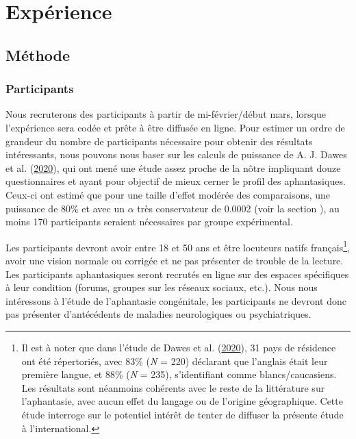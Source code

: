 \documentclass[
  12pt,
]{article}
\begin{document}
\hypertarget{expuxe9rience}{%
\section{Expérience}\label{expuxe9rience}}

\hypertarget{muxe9thode}{%
\subsection{Méthode}\label{muxe9thode}}

\hypertarget{participants}{%
\subsubsection{Participants}\label{participants}}

Nous recruterons des participants à partir de mi-février/début mars,
lorsque l'expérience sera codée et prête à être diffusée en ligne. Pour
estimer un ordre de grandeur du nombre de participants nécessaire pour
obtenir des résultats intéressants, nous pouvons nous baser sur les
calculs de puissance de A. J. Dawes et al.
(\protect\hyperlink{ref-dawesCognitiveProfileMultisensory2020}{2020}),
qui ont mené une étude assez proche de la nôtre impliquant douze
questionnaires et ayant pour objectif de mieux cerner le profil des
aphantasiques. Ceux-ci ont estimé que pour une taille d'effet modérée
des comparaisons, une puissance de 80\% et avec un \(\alpha\) très
conservateur de 0.0002 (voir la section \emph{}), au
moins 170 participants seraient nécessaires par groupe expérimental.

Les participants devront avoir entre 18 et 50 ans et être locuteurs
natifs français\footnote{Il est à noter que dans l'étude de Dawes et al.
  (\protect\hyperlink{ref-dawesCognitiveProfileMultisensory2020}{2020}),
  31 pays de résidence ont été répertoriés, avec 83\% (\emph{N} = 220)
  déclarant que l'anglais était leur première langue, et 88\% (\emph{N}
  = 235), s'identifiant comme blancs/caucasiens. Les résultats sont
  néanmoins cohérents avec le reste de la littérature sur l'aphantasie,
  avec aucun effet du langage ou de l'origine géographique. Cette étude
  interroge sur le potentiel intérêt de tenter de diffuser la présente
  étude à l'international.}, avoir une vision normale ou corrigée et ne
pas présenter de trouble de la lecture. Les participants aphantasiques
seront recrutés en ligne sur des espaces spécifiques à leur condition
(forums, groupes sur les réseaux sociaux, etc.). Nous nous intéressons à
l'étude de l'aphantasie congénitale, les participants ne devront donc
pas présenter d'antécédents de maladies neurologiques ou psychiatriques.
\end{document}
